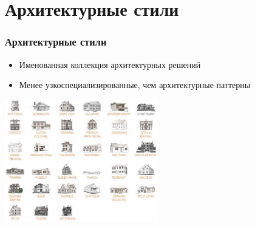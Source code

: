 \documentclass{../../slides-style}
\begin{document}
    \section{Архитектурные стили}

    \begin{frame}
        \frametitle{Архитектурные стили}
        \begin{itemize}
            \item Именованная коллекция архитектурных решений
            \item Менее узкоспециализированные, чем архитектурные паттерны
        \end{itemize}
        \begin{center}
            \includegraphics[width=0.5\textwidth]{buildingStyles.png}
        \end{center}
    \end{frame}
\end{document}
